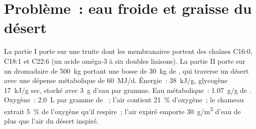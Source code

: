 \section{Problème~: eau froide et graisse du désert}

\begin{problem}
\label{pb:b1:lipids:1}
La partie I porte sur une truite dont les  membranaires
portent des chaînes C16:0, C18:1 et C22:6 (un acide oméga-3 à six
doubles liaisons). La partie II porte sur un dromadaire de
\qty{500}{kg} portant une bosse de \qty{30}{kg} de , qui
traverse un désert avec une dépense métabolique de \qty{60}{MJ/d}.
Énergie~:  \qty{38}{kJ/g}, glycogène \qty{17}{kJ/g} sec, stocké
avec \qty{3}{g} d'eau par gramme. Eau métabolique~: \qty{1.07}{g/g} de
. Oxygène~: \qty{2.0}{L} par gramme de ~; l'air contient
\qty{21}{\%} d'oxygène~; le chameau extrait \qty{5}{\%} de l'oxygène
qu'il respire~; l'air expiré emporte \qty{30}{g/m^3} d'eau de plus que
l'air du désert inspiré.


\end{problem}

